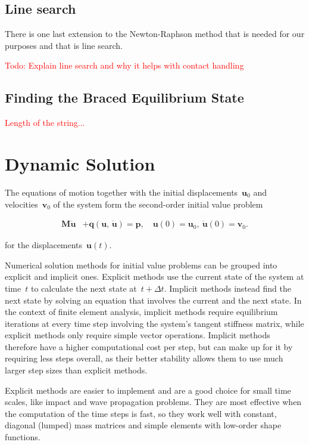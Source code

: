 \subsection{Line search}

There is one last extension to the Newton-Raphson method that is needed for our purposes and that is line search. 

\textcolor{red}{Todo: Explain line search and why it helps with contact handling}

\newpage
\subsection{Finding the Braced Equilibrium State}

\textcolor{red}{Length of the string...}

\section{Dynamic Solution}

The equations of motion together with the initial displacements~$\boldsymbol{u}_0$ and velocities~$\boldsymbol{v}_0$ of the system form the second-order initial value problem

\begin{align}
\boldsymbol{M}\ddot{\boldsymbol{u}} &+ \boldsymbol{q}(\boldsymbol{u},\,\ddot{\boldsymbol{u}}) = \boldsymbol{p},\quad \boldsymbol{u}(0) = \boldsymbol{u}_0,\ \ddot{\boldsymbol{u}}(0) = \boldsymbol{v}_0.\label{eq:dynamics:system_equation}
\end{align}

for the displacements~$\boldsymbol{u}(t)$.

Numerical solution methods for initial value problems can be grouped into explicit and implicit ones.
Explicit methods use the current state of the system at time~$t$ to calculate the next state at~$t + \Delta t$.
Implicit methods instead find the next state by solving an equation that involves the current and the next state.
In the context of finite element analysis, implicit methods require equilibrium iterations at every time step involving the system's tangent stiffness matrix, while explicit methods only require simple vector operations.
Implicit methods therefore have a higher computational cost per step, but can make up for it by requiring less steps overall, as their better stability allows them to use much larger step sizes than explicit methods.

Explicit methods are easier to implement and are a good choice for small time scales, like impact and wave propagation problems.
They are most effective when the computation of the time steps is fast, so they work well with constant, diagonal (lumped) mass matrices and simple elements with low-order shape functions.


